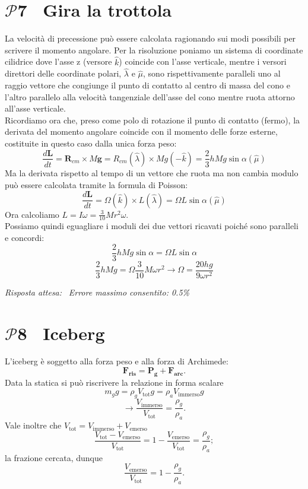 \documentclass[a4paper,12pt]{article}
\newcommand{\problemtitle}[1]{
  \noindent
  \textbf{\Large #1}\hspace{0.5em}
  \raisebox{0.6ex}{\rule{\linewidth - \widthof{\textbf{\Large #1}} - 0.6em}{0.4pt}}%
}
\begin{document}
\section*{\problemtitle{$\mathcal{P}${\small{7}} \ Gira la trottola}}
La velocità di precessione può essere calcolata ragionando sui modi possibili per scrivere il momento angolare.
Per la risoluzione poniamo un sistema di coordinate cilidrice dove l'asse z (versore $\hat{k}$) coincide con l'asse verticale, mentre i versori direttori delle coordinate polari, $\hat{\lambda}$ e $\hat{\mu}$, sono rispettivamente paralleli uno al raggio vettore che congiunge il punto di contatto al centro di massa del cono e l'altro parallelo alla velocità tangenziale dell'asse del cono mentre ruota attorno all'asse verticale.\\
Ricordiamo ora che, preso come polo di rotazione il punto di contatto (fermo), la derivata del momento angolare coincide con il momento delle forze esterne, costituite in questo caso dalla unica forza peso:
\[
\frac{d\mathbf{L}}{dt} = \mathbf{R}_{cm} \times M\mathbf{g} = R_{cm}(\hat{\lambda}) \times Mg(-\hat{k}) = \frac{2}{3}hMg\sin\alpha (\hat{\mu}) \tag{7.0}
\]
Ma la derivata rispetto al tempo di un vettore che ruota ma non cambia modulo può essere calcolata tramite la formula di Poisson:
\[
    \frac{d\mathbf{L}}{dt} = \Omega(\hat{k}) \times L(\hat{\lambda}) = \Omega L \sin\alpha(\hat{\mu}) \tag{7.1}
\]
Ora calcoliamo $L = I\omega = \frac{3}{10}M r^2 \omega$.\\
Possiamo quindi eguagliare i moduli dei due vettori ricavati poiché sono paralleli e concordi:
\[
\frac{2}{3}hMg\sin\alpha = \Omega L \sin\alpha \tag{7.2}
\]
\[
\frac{2}{3}hMg = \Omega \frac{3}{10}M\omega r^2  \rightarrow \Omega =\frac{20hg}{9\omega r^2 } \tag{7.3}
\]


\textit{Risposta attesa:}  \, \textit{Errore massimo consentito: 0.5\%}

\section*{\problemtitle{$\mathcal{P}${\small{8}} \ Iceberg}}
L'iceberg è soggetto alla forza peso e alla forza di Archimede:
\[
\mathbf{F_{\text{ris}}} = \mathbf{P_{\text{g}}} + \mathbf{F_{\text{arc}}}. \tag{8.0}
\]
Data la statica si può riscrivere la relazione in forma scalare
\[
m_{g}g = \rho_{g} V_{\text{tot}} g = \rho_{a} V_{\text{immerso}}g \tag{8.1}
\]
\[
\rightarrow \frac{V_{\text{immerso}}}{V_{\text{tot}}} = \frac{\rho_g}{\rho_a}. \tag{8.2}
\]
Vale inoltre che $V_{\text{tot}} = V_{\text{immerso}} + V_{\text{emerso}}$
\[
\frac{V_{\text{tot}} - V_{\text{emerso}}}{V_{\text{tot}}} = 1 - \frac{V_{\text{emerso}}}{V_{\text{tot}}} = \frac{\rho_g}{\rho_a}; \tag{8.3}
\]
la frazione cercata, dunque
\[
\frac{V_{\text{emerso}}}{V_{\text{tot}}} = 1 - \frac{\rho_g}{\rho_a}. \tag{8.4}
\]
\end{document}
